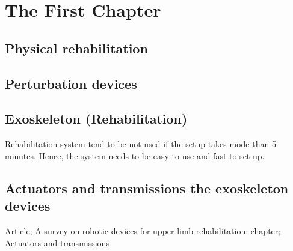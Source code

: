 \chapter{The First Chapter}\label{chap:first}

\section{Physical rehabilitation}
\section{Perturbation devices}
\section{Exoskeleton (Rehabilitation)}
Rehabilitation system tend to be not used if the setup takes mode than 5 minutes. Hence, the system needs to be easy to use and fast to set up.  
\section{Actuators and transmissions the exoskeleton devices}
Article; A survey on robotic devices for upper limb rehabilitation. chapter; Actuators and transmissions

\begin{comment}


\section{Reffs}
\cite{NEUROExos}
\cite{shapeMemoryAlloy}
\cite{rahman2019review}
\cite{rahman2015emg}
\cite{moura2016exoskeleton}
\cite{maciejasz2014survey}
\cite{blank2014current}
\cite{khan2017neurorehabilitation}
\cite{geurts2005review}
\cite{rehmat2018upper}
\cite{Schorsch2014}
\cite{sEMG-based2019}
\cite{lu2019development}
\cite{sridar2017development}
\cite{tuatulea2019mechanical}

\cite{thoroughman1999electromyographic}

\cite{evison2016design}
\end{comment}